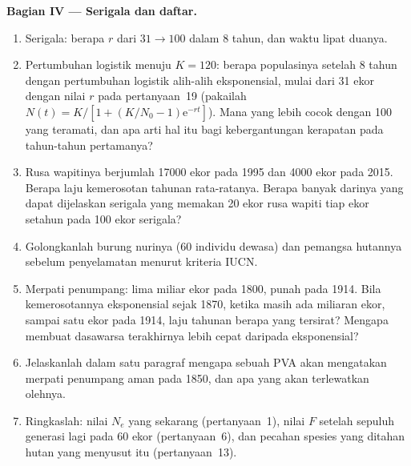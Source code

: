 \begin{problem}
\medskip
\noindent\textbf{Bagian IV --- Serigala dan daftar.}
\begin{enumerate}[resume]
  \item Serigala: berapa $r$ dari $31 \to 100$ dalam 8 tahun, dan waktu
        lipat duanya.
  \item Pertumbuhan logistik menuju $K = 120$: berapa populasinya setelah
        8 tahun dengan pertumbuhan logistik alih-alih eksponensial, mulai
        dari 31 ekor dengan nilai $r$ pada pertanyaan~19 (pakailah
        $N(t) = K/[1 + (K/N_{0} -
        1)\mathrm{e}^{-rt}]$). Mana yang lebih cocok dengan 100 yang
        teramati, dan apa arti hal itu bagi kebergantungan kerapatan pada
        tahun-tahun pertamanya?
  \item Rusa wapitinya berjumlah \num{17000} ekor pada 1995 dan
        \num{4000} ekor pada 2015. Berapa laju kemerosotan tahunan
        rata-ratanya. Berapa banyak darinya yang dapat dijelaskan serigala
        yang memakan \num{20} ekor rusa wapiti tiap ekor setahun pada 100
        ekor serigala?
  \item Golongkanlah burung nurinya (60 individu dewasa) dan pemangsa
        hutannya sebelum penyelamatan menurut kriteria IUCN.
  \item Merpati penumpang: lima miliar ekor pada 1800, punah pada 1914.
        Bila kemerosotannya eksponensial sejak 1870, ketika masih ada
        miliaran ekor, sampai satu ekor pada 1914, laju tahunan berapa yang
        tersirat? Mengapa  membuat dasawarsa terakhirnya lebih
        cepat daripada eksponensial?
  \item Jelaskanlah dalam satu paragraf mengapa sebuah PVA akan mengatakan
        merpati penumpang aman pada 1850, dan apa yang akan terlewatkan olehnya.
  \item Ringkaslah: nilai $N_{e}$ yang sekarang (pertanyaan~1), nilai $F$
        setelah sepuluh generasi lagi pada 60 ekor (pertanyaan~6), dan
        pecahan spesies yang ditahan hutan yang menyusut itu (pertanyaan~13).
\end{enumerate}
\end{problem}

